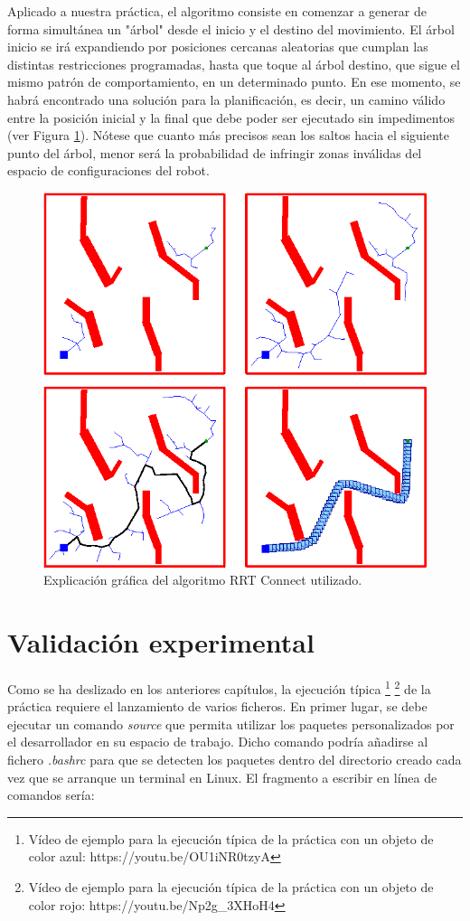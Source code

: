 \documentclass[12pt,spanish,chapterprefix, numbers=noenddot]{book}
\numberwithin{equation}{section}
\numberwithin{figure}{section}
\begin{document}
Aplicado a nuestra práctica, el algoritmo consiste en comenzar a generar de forma simultánea un "árbol"  desde el inicio y el destino del movimiento. El árbol inicio se irá expandiendo por posiciones cercanas aleatorias que cumplan las distintas restricciones programadas, hasta que toque al árbol destino, que sigue el mismo patrón de comportamiento, en un determinado punto. En ese momento, se habrá encontrado una solución para la planificación, es decir, un camino válido entre la posición inicial y la final que debe poder ser ejecutado sin impedimentos (ver Figura \ref{fig:rrtConnect}). Nótese que cuanto más precisos sean los saltos hacia el siguiente punto del árbol, menor será la probabilidad de infringir zonas inválidas del espacio de configuraciones del robot. 

\begin{figure}[hbt!]
\centering
\includegraphics[width=12cm]{Figs/rrtConnect.png}
\par
\caption{\label{fig:rrtConnect}Explicación gráfica del algoritmo RRT Connect utilizado.}
\end{figure}

\section{Validación experimental}
Como se ha deslizado en los anteriores capítulos, la ejecución típica \footnote{Vídeo de ejemplo para la ejecución típica de la práctica con un objeto de color azul: https://youtu.be/OU1iNR0tzyA} \footnote{Vídeo de ejemplo para la ejecución típica de la práctica con un objeto de color rojo: https://youtu.be/Np2g\_3XHoH4} de la práctica requiere el lanzamiento de varios ficheros. En primer lugar, se debe ejecutar un comando \textit{source} que permita utilizar los paquetes personalizados por el desarrollador en su espacio de trabajo. Dicho comando podría añadirse al fichero \textit{.bashrc} para que se detecten los paquetes dentro del directorio creado cada vez que se arranque un terminal en Linux. El fragmento a escribir en línea de comandos sería: 
\end{document}
